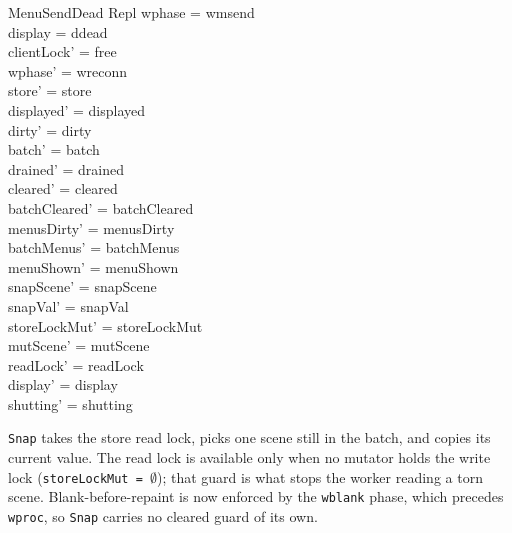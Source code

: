 \documentclass[a4paper,10pt,fleqn]{article}
\begin{document}
\begin{schema}{MenuSendDead}
  \Delta Repl
\where
  wphase = wmsend \\
  display = ddead \\
  clientLock' = free \\
  wphase' = wreconn \\
  store' = store \\
  displayed' = displayed \\
  dirty' = dirty \\
  batch' = batch \\
  drained' = drained \\
  cleared' = cleared \\
  batchCleared' = batchCleared \\
  menusDirty' = menusDirty \\
  batchMenus' = batchMenus \\
  menuShown' = menuShown \\
  snapScene' = snapScene \\
  snapVal' = snapVal \\
  storeLockMut' = storeLockMut \\
  mutScene' = mutScene \\
  readLock' = readLock \\
  display' = display \\
  shutting' = shutting
\end{schema}

\texttt{Snap} takes the store read lock, picks one scene still in the
batch, and copies its current value.  The read lock is available only when
no mutator holds the write lock (\texttt{storeLockMut = $\emptyset$}); that
guard is what stops the worker reading a torn scene.  Blank-before-repaint
is now enforced by the \texttt{wblank} phase, which precedes \texttt{wproc},
so \texttt{Snap} carries no cleared guard of its own.
\end{document}
